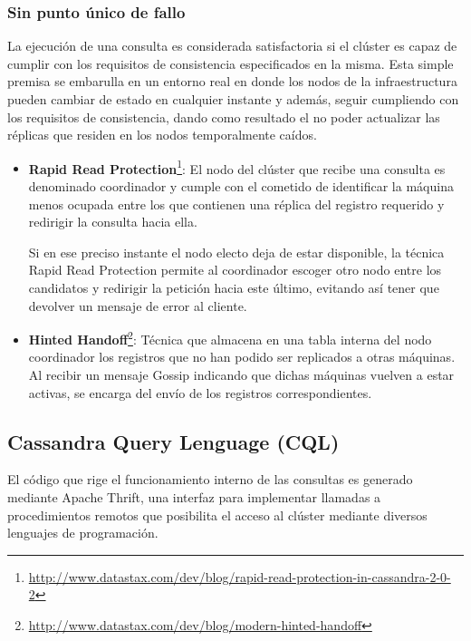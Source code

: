 \subsubsection{Sin punto único de fallo}

La ejecución de una consulta es considerada satisfactoria si el clúster es capaz de cumplir con los requisitos de consistencia especificados en la misma. Esta simple premisa se embarulla en un entorno real en donde los nodos de la infraestructura pueden cambiar de estado en cualquier instante y además, seguir cumpliendo con los requisitos de consistencia, dando como resultado el no poder actualizar las réplicas que residen en los nodos temporalmente caídos. 

\begin{itemize}

\item \textbf{Rapid Read Protection}\footnote{\url{http://www.datastax.com/dev/blog/rapid-read-protection-in-cassandra-2-0-2}}: El nodo del clúster que recibe una consulta es denominado coordinador y cumple con el cometido de identificar la máquina menos ocupada entre los que contienen una réplica del registro requerido y redirigir la consulta hacia ella.

Si en ese preciso instante el nodo electo deja de estar disponible, la técnica Rapid Read Protection permite al coordinador escoger otro nodo entre los candidatos y redirigir la petición hacia este último, evitando así tener que devolver un mensaje de error al cliente.

\item \textbf{Hinted Handoff}\footnote{\url{http://www.datastax.com/dev/blog/modern-hinted-handoff}}: Técnica que almacena en una tabla interna del nodo coordinador los registros que no han podido ser replicados a otras máquinas. Al recibir un mensaje Gossip indicando que dichas máquinas vuelven a estar activas, se encarga del envío de los registros correspondientes.

\end{itemize}

\subsection{Cassandra Query Lenguage (CQL)}

El código que rige el funcionamiento interno de las consultas es generado mediante Apache Thrift\cite{slee2007thrift}, una interfaz para implementar llamadas a procedimientos remotos\cite{nelson1981remote} que posibilita el acceso al clúster mediante diversos lenguajes de programación.\\

